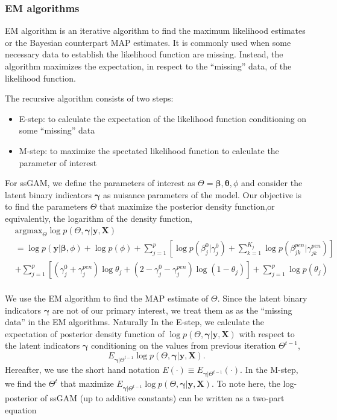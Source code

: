 \documentclass[AMA,STIX1COL,]{WileyNJD-v2}
\providecommand{\tightlist}{%
  \setlength{\itemsep}{0pt}\setlength{\parskip}{0pt}}
\begin{document}
\hfill\break

\hypertarget{em-algorithms}{%
\subsubsection{EM algorithms}\label{em-algorithms}}

EM algorithm is an iterative algorithm to find the maximum likelihood
estimates or the Bayesian counterpart MAP estimates. It is commonly used
when some necessary data to establish the likelihood function are
missing. Instead, the algorithm maximizes the expectation, in respect to
the ``missing'' data, of the likelihood function.

The recursive algorithm consists of two steps:

\begin{itemize}
\tightlist
\item
  E-step: to calculate the expectation of the likelihood function
  conditioning on some ``missing'' data
\item
  M-step: to maximize the spectated likelihood function to calculate the
  parameter of interest
\end{itemize}

For ssGAM, we define the parameters of interest as
\(\Theta = {\boldsymbol{\beta}, \boldsymbol{\theta}, \phi}\) and
consider the latent binary indicators \(\boldsymbol{\gamma}\) as
nuisance parameters of the model. Our objective is to find the
parameters \(\Theta\) that maximize the posterior density function,or
equivalently, the logarithm of the density function, \[
\begin{aligned}
& \text{argmax}_{\Theta}
\log p(\Theta, \boldsymbol{\gamma}| \textbf{y}, \textbf{X}) \\
&= \log p(\textbf{y}|\boldsymbol{\beta}, \phi) + \log p(\phi) + \sum\limits_{j=1}^p\left[\log p(\beta^0_j|\gamma^0_j)+\sum\limits_{k=1}^{K_j} \log p(\beta^{pen}_{jk}|\gamma^{pen}_{jk})\right]\\
& +\sum\limits_{j=1}^{p} \left[ (\gamma^0_j+\gamma_{j}^{pen})\log \theta_j + (2-\gamma^0_j-\gamma_{j}^{pen}) \log (1-\theta_j)\right] +  \sum\limits_{j=1}^{p}\log p(\theta_j)
\end{aligned}
\]\\

We use the EM algorithm to find the MAP estimate of \(\Theta\). Since
the latent binary indicators \(\boldsymbol{\gamma}\) are not of our
primary interest, we treat them as as the ``missing data'' in the EM
algorithms. Naturally In the E-step, we calculate the expectation of
posterior density function of
\(\log p(\Theta, \boldsymbol{\gamma}| \textbf{y}, \textbf{X})\) with
respect to the latent indicators \(\boldsymbol{\gamma}\) conditioning on
the values from previous iteration \(\Theta^{t-1}\), \[
E_{\boldsymbol{\gamma}|\Theta^{t-1}}\log p(\Theta, \boldsymbol{\gamma}| \textbf{y}, \textbf{X}) .
\] Hereafter, we use the short hand notation
\(E(\cdot)\equiv E_{\boldsymbol{\gamma}|\Theta^{t-1}}(\cdot)\). In the
M-step, we find the \(\Theta^{t}\) that maximize
\(E_{\boldsymbol{\gamma}|\Theta^{t-1}}\log p(\Theta, \boldsymbol{\gamma}| \textbf{y}, \textbf{X})\).
To note here, the log-posterior of ssGAM (up to additive constants) can
be written as a two-part equation
\end{document}
